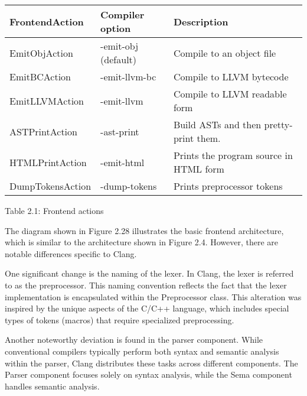 \begin{longtable}{|l|l|l|}
\hline
\textbf{FrontendAction} & \textbf{Compiler option} & \textbf{Description}                   \\ \hline
\endfirsthead
%
\endhead
%
EmitObjAction           & -emit-obj (default)      & Compile to an object file              \\ \hline
EmitBCAction            & -emit-llvm-bc            & Compile to LLVM bytecode               \\ \hline
EmitLLVMAction          & -emit-llvm               & Compile to LLVM readable form          \\ \hline
ASTPrintAction          & -ast-print               & Build ASTs and then pretty-print them. \\ \hline
HTMLPrintAction         & -emit-html               & Prints the program source in HTML form \\ \hline
DumpTokensAction        & -dump-tokens             & Prints preprocessor tokens             \\ \hline
\end{longtable}

\begin{center}
Table 2.1: Frontend actions
\end{center}


The diagram shown in Figure 2.28 illustrates the basic frontend architecture, which is similar to the architecture shown in Figure 2.4. However, there are notable differences specific to Clang.

One significant change is the naming of the lexer. In Clang, the lexer is referred to as the preprocessor. This naming convention reflects the fact that the lexer implementation is encapsulated within the Preprocessor class. This alteration was inspired by the unique aspects of the C/C++ language, which includes special types of tokens (macros) that require specialized preprocessing.

Another noteworthy deviation is found in the parser component. While conventional compilers typically perform both syntax and semantic analysis within the parser, Clang distributes these tasks across different components. The Parser component focuses solely on syntax analysis, while the Sema component handles semantic analysis.

